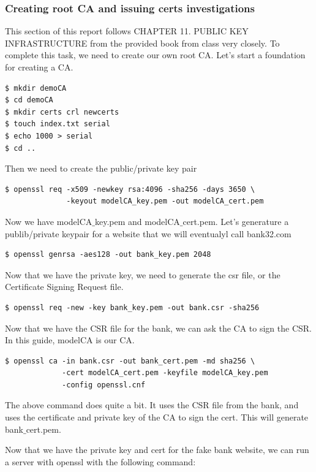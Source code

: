 \documentclass[12pt]{article}
\newcommand\tab[1][0.5cm]{\hspace*{#1}}
\begin{document}
\subsubsection{Creating root CA and issuing certs investigations}

This section of this report follows CHAPTER 11. PUBLIC KEY INFRASTRUCTURE from the provided book from class very closely. To complete this task, we need to create our own root CA. Let's start a foundation for creating a CA.

\begin{verbatim}
$ mkdir demoCA
$ cd demoCA
$ mkdir certs crl newcerts
$ touch index.txt serial
$ echo 1000 > serial
$ cd ..
\end{verbatim}

Then we need to create the public/private key pair

\begin{verbatim}
$ openssl req -x509 -newkey rsa:4096 -sha256 -days 3650 \
              -keyout modelCA_key.pem -out modelCA_cert.pem
\end{verbatim}

Now we have modelCA$\_$key.pem and modelCA$\_$cert.pem. Let's generature a publib/private keypair for a website that we will eventualyl call bank32.com

\begin{verbatim}
$ openssl genrsa -aes128 -out bank_key.pem 2048
\end{verbatim}

Now that we have the private key, we need to generate the csr file, or the Certificate Signing Request file.

\begin{verbatim}
$ openssl req -new -key bank_key.pem -out bank.csr -sha256
\end{verbatim}

Now that we have the CSR file for the bank, we can ask the CA to sign the CSR. In this guide, modelCA is our CA.

\begin{verbatim}
$ openssl ca -in bank.csr -out bank_cert.pem -md sha256 \
             -cert modelCA_cert.pem -keyfile modelCA_key.pem 
             -config openssl.cnf
\end{verbatim}

\tab The above command does quite a bit. It uses the CSR file from the bank, and uses the certificate and private key of the CA to sign the cert. This will generate bank$\_$cert.pem.

\tab Now that we have the private key and cert for the fake bank website, we can run a server with openssl with the following command:
\end{document}
